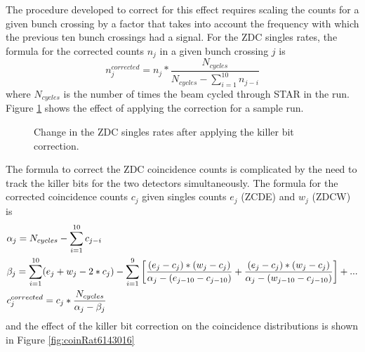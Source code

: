 The procedure developed to correct for this effect requires scaling the counts
for a given bunch crossing by a factor that takes into account the frequency
with which the previous ten bunch crossings had a signal. For the ZDC singles
rates, the formula for the corrected counts $n_{j}$ in a given bunch crossing
$j$ is
%
\begin{equation}
  n_{j}^{corrected} = n_{j} * \frac{N_{cycles}}{N_{cycles} - \sum_{i=1}^{10}n_{j-i}}
\end{equation}
%
where $N_{cycles}$ is the number of times the beam cycled through STAR in the
run. Figure \ref{fig:zdc-singles-ratio} shows the effect of applying the
correction for a sample run.

\begin{figure}
  \caption{Change in the ZDC singles rates after applying the killer bit correction.}
  \label{fig:zdc-singles-ratio}
\end{figure}

The formula to correct the ZDC coincidence counts is complicated by the need
to track the killer bits for the two detectors simultaneously. The formula for
the corrected coincidence counts $c_{j}$ given singles counts $e_{j}$ (ZCDE)
and $w_{j}$ (ZDCW) is
%
\begin{align}
  &\alpha_{j} = N_{cycles} - \sum_{i=1}^{10}c_{j-i} \notag\\
  &\beta_{j} = \sum_{i=1}^{10}(e_{j} + w_{j} - 2*c_{j}) - \sum_{i=1}^{9}\left[\frac{(e_{j}-c_{j}) * (w_{j}-c_{j})}{\alpha_{j}-(e_{j-10}-c_{j-10})} + \frac{(e_{j}-c_{j}) * (w_{j}-c_{j})}{\alpha_{j}-(w_{j-10}-c_{j-10})}\right] + ... \notag\\
  &c_{j}^{corrected} = c_{j} * \frac{N_{cycles}}{\alpha_{j} - \beta_{j}} 
\end{align}
%
and the effect of the killer bit correction on the coincidence distributions
is shown in Figure \ref{fig:coinRat6143016}

